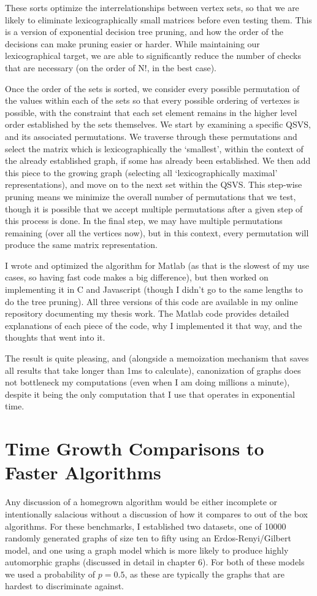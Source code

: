 These sorts optimize the interrelationships between vertex sets, so that we are likely to eliminate lexicographically small matrices before even testing them.
This is a version of exponential decision tree pruning, and how the order of the decisions can make pruning easier or harder.
While maintaining our lexicographical target, we are able to significantly reduce the number of checks that are necessary (on the order of N!, in the best case).

Once the order of the sets is sorted, we consider every possible permutation of the values within each of the sets so that every possible ordering of vertexes is possible, with the constraint that each set element remains in the higher level order established by the sets themselves.
We start by examining a specific QSVS, and its associated permutations.
We traverse through these permutations and select the matrix which is lexicographically the `smallest', within the context of the already established graph, if some has already been established.
We then add this piece to the growing graph (selecting all `lexicographically maximal' representations), and move on to the next set within the QSVS.
This step-wise pruning means we minimize the overall number of permutations that we test, though it is possible that we accept multiple permutations after a given step of this process is done.
In the final step, we may have multiple permutations remaining (over all the vertices now), but in this context, every permutation will produce the same matrix representation.

I wrote and optimized the algorithm for Matlab (as that is the slowest of my use cases, so having fast code makes a big difference), but then worked on implementing it in C and Javascript (though I didn't go to the same lengths to do the tree pruning).
All three versions of this code are available in my online repository documenting my thesis work.
The Matlab code provides detailed explanations of each piece of the code, why I implemented it that way, and the thoughts that went into it.

The result is quite pleasing, and (alongside a memoization mechanism that saves all results that take longer than 1ms to calculate), canonization of graphs does not bottleneck my computations (even when I am doing millions a minute), despite it being the only computation that I use that operates in exponential time.

\section{Time Growth Comparisons to Faster Algorithms}
Any discussion of a homegrown algorithm would be either incomplete or intentionally salacious without a discussion of how it compares to out of the box algorithms.
For these benchmarks, I established two datasets, one of 10000 randomly generated graphs of size ten to fifty using an Erdos-Renyi/Gilbert model, and one using a graph model which is more likely to produce highly automorphic graphs (discussed in detail in chapter 6).
For both of these models we used a probability of $p=0.5$, as these are typically the graphs that are hardest to discriminate against.

